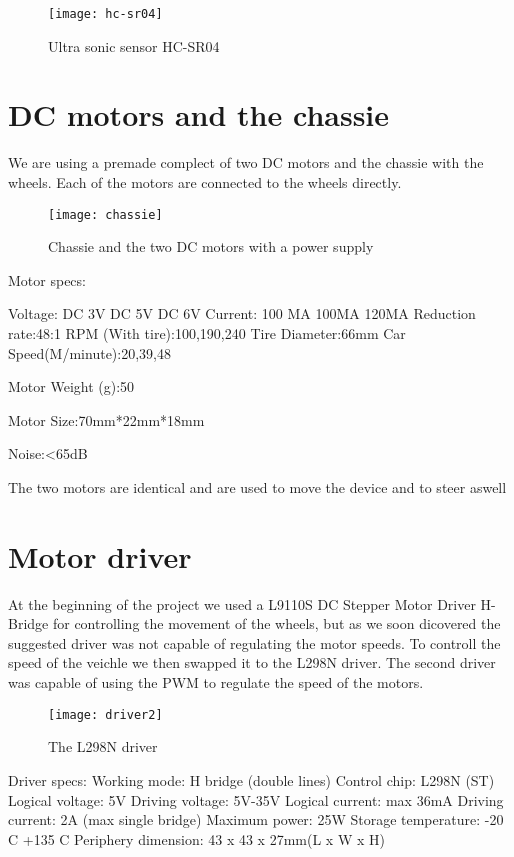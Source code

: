 \begin{figure}[h]
\centering
\texttt{[image: hc-sr04]}
\caption{Ultra sonic sensor HC-SR04}
\label{fig::hcsr04}
\end{figure}

\section{DC motors and the chassie} 

We are using a premade complect of two DC motors and the chassie with the wheels.
Each of the motors are connected to the wheels directly.

\begin{figure}[h]
\centering
\texttt{[image: chassie]}
\caption{Chassie and the two DC motors with a power supply}
\label{fig::chassie}
\end{figure}

Motor specs:

 Voltage:
DC 3V
DC 5V
DC 6V
Current:
100 MA
100MA
120MA
Reduction rate:48:1
RPM (With tire):100,190,240
Tire Diameter:66mm
Car Speed(M/minute):20,39,48

Motor Weight (g):50

Motor Size:70mm*22mm*18mm

Noise:<65dB 

The two motors are identical and are used to move the device and to steer aswell

\section{Motor driver} 

At the beginning of the project we used a L9110S DC Stepper Motor Driver H-Bridge for controlling the movement of the wheels, but as we soon dicovered the suggested driver was not capable of regulating the motor speeds.
To controll the speed of the veichle we then swapped it to the L298N driver.
The second driver was capable of using the PWM to regulate the speed of the motors.

\begin{figure}[h]
\centering
\texttt{[image: driver2]}
\caption{The L298N driver}
\label{fig::driver2}
\end{figure}

Driver specs:
Working mode:	H bridge (double lines)
Control chip:	L298N (ST)
Logical voltage:	5V
Driving voltage:	5V-35V
Logical current:	max 36mA
Driving current:	2A (max single bridge)
Maximum power:	25W
Storage temperature:	-20 C +135 C
Periphery dimension:	43 x 43 x 27mm(L x W x H)

